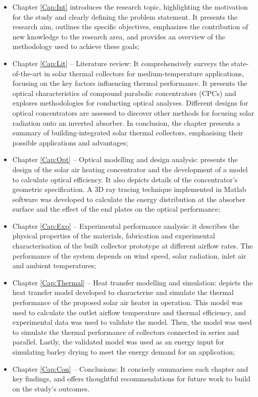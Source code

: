 \begin{itemize}
	\item Chapter \ref{Cap:Int} introduces the research topic, highlighting the motivation for the study and clearly defining the problem statement. It presents the research aim, outlines the specific objectives, emphasizes the contribution of new knowledge to the research area, and provides an overview of the methodology used to achieve these goals;
	\item Chapter \ref{Cap:Lit} -- Literature review: It comprehensively surveys the state-of-the-art in solar thermal collectors for medium-temperature applications, focusing on the key factors influencing thermal performance. It presents the optical characteristics of compound parabolic concentrators (CPCs) and explores methodologies for conducting optical analyses. Different designs for optical concentrators are assessed to discover other methods for focusing solar radiation onto an inverted absorber. In conclusion, the chapter presents a summary of building-integrated solar thermal collectors, emphasising their possible applications and advantages;
	\item Chapter \ref{Cap:Opt} -- Optical modelling and design analysis: presents the design of the solar air heating concentrator and the development of a model to calculate optical efficiency. It also depicts details of the concentrator's geometric specification. A 3D ray tracing technique implemented in Matlab software was developed to calculate the energy distribution at the absorber surface and the effect of the end plates on the optical performance;
	\item Chapter \ref{Cap:Exp} -- Experimental performance analysis: it describes the physical properties of the materials, fabrication and experimental characterisation of the built collector prototype at different airflow rates. The performance of the system depends on wind speed, solar radiation, inlet air and ambient temperatures;
	\item Chapter \ref{Cap:Thermal} -- Heat transfer modelling and simulation: depicts the heat transfer model developed to characterise and simulate the thermal performance of the proposed solar air heater in operation. This model was used to calculate the outlet airflow temperature and thermal efficiency, and experimental data was used to validate the model. Then, the model was used to simulate the thermal performance of collectors connected in series and parallel. Lastly, the validated model was used as an energy input for simulating barley drying to meet the energy demand for an application;
	\item Chapter \ref{Cap:Con} -- Conclusions: It concisely summarises each chapter and key findings, and offers thoughtful recommendations for future work to build on the study's outcomes.
\end{itemize}


